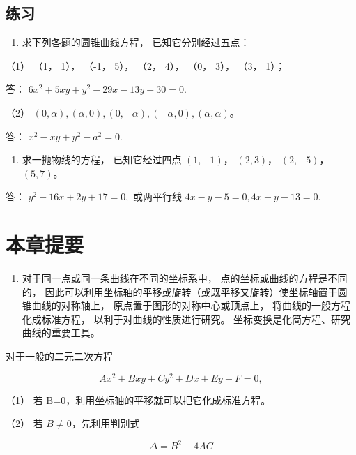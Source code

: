 \subsection{练习}\label{ux7ec3ux4e60-17}

\begin{enumerate}
\def\labelenumi{\arabic{enumi}.}
\tightlist
\item
  求下列各题的圆锥曲线方程， 已知它分别经过五点：
\end{enumerate}

（1） （1， 1）， （-1， 5）， （2， 4）， （0， 3）， （3， 1）；

答： \(6x^{2}+5xy+y^{2}-29x-13y+30=0.\)

（2）
\((0, \alpha), (\alpha, 0), (0, -\alpha), (-\alpha, 0), (\alpha, \alpha)\)。

答： \(x^{2} - xy + y^{2} - a^{2} = 0.\)

\begin{enumerate}
\def\labelenumi{\arabic{enumi}.}
\setcounter{enumi}{1}
\tightlist
\item
  求一抛物线的方程， 已知它经过四点 \((1, -1)\)， \((2, 3)\)，
  \((2, -5)\)， \((5, 7)\)。
\end{enumerate}

答： \(y^{2}-16x+2y+17=0,\) 或两平行线
\(4x - y - 5 = 0, 4x - y - 13 = 0.\)

\section{本章提要}\label{ux672cux7ae0ux63d0ux8981-4}

\begin{enumerate}
\def\labelenumi{\arabic{enumi}.}
\tightlist
\item
  对于同一点或同一条曲线在不同的坐标系中，
  点的坐标或曲线的方程是不同的，
  因此可以利用坐标轴的平移或旋转（或既平移又旋转）使坐标轴置于圆锥曲线的对称轴上，
  原点置于图形的对称中心或顶点上， 将曲线的一般方程化成标准方程，
  以利于对曲线的性质进行研究。 坐标变换是化简方程、研究曲线的重要工具。
\end{enumerate}

对于一般的二元二次方程

\[
A x^{2} + B x y + C y^{2} + D x + E y + F = 0,
\]

（1） 若 B=0，利用坐标轴的平移就可以把它化成标准方程。

（2） 若 \(B \neq 0\)，先利用判别式

\[
\Delta = B^{2} - 4 AC
\]

